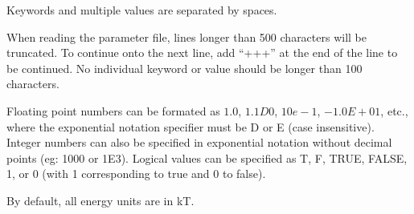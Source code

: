 \documentclass[12pt]{article}
\begin{document}
Keywords and multiple values are separated by spaces. 

When reading the parameter file, lines longer than 500 characters will be truncated. To continue onto the next line, add ``+++'' at the end of the line to be continued.
No individual keyword or  value should be longer than 100 characters.

Floating point numbers can be formated as $1.0$, $1.1D0$, $10e-1$, $-1.0E+01$, etc., where the exponential notation specifier must be D or E (case insensitive). Integer numbers can also be specified in exponential notation without decimal points (eg: 1000 or 1E3). Logical values can be specified as T, F, TRUE, FALSE, 1, or 0 (with 1 corresponding to true and 0 to false).

By default, all energy units are in kT. 
\end{document}
